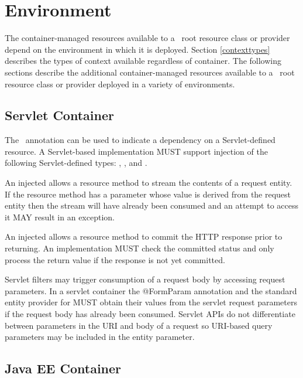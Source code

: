 \chapter{Environment}
\label{environment}

The container-managed resources available to a \jaxrs\ root resource class or provider depend on the environment in which it is deployed. Section \ref{contexttypes} describes the types of context available regardless of container. The following sections describe the additional container-managed resources available to a \jaxrs\ root resource class or provider deployed in a variety of environments.

\section{Servlet Container}
\label{servlet_container}

The \Context\ annotation can be used to indicate a dependency on a Servlet-defined resource. A Servlet-based implementation MUST support injection of the following Servlet-defined types: , ,  and .

An injected  allows a resource method to stream the contents of a request entity. If the resource method has a parameter whose value is derived from the request entity then the stream will have already been consumed and an attempt to access it MAY result in an exception.

An injected  allows a resource method to commit the HTTP response prior to returning. An implementation MUST check the committed status and only process the return value if the response is not yet committed.

Servlet filters may trigger consumption of a request body by accessing request parameters. In a servlet container the @FormParam annotation and the standard entity provider for  MUST obtain their values from the servlet request parameters if the request body has already been consumed. Servlet APIs do not differentiate between parameters in the URI and body of a request so URI-based query parameters may be included in the entity parameter.

\section{Java EE Container}
\label{javaee}

